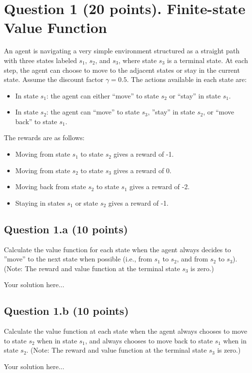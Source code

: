 \documentclass[12pt]{article}
\begin{document}
\section*{Question 1 (20 points). Finite-state Value Function}
An agent is navigating a very simple environment structured as a straight path with three states labeled $s_1$, $s_2$, and $s_3$, where state $s_3$ is a terminal state. At each step, the agent can choose to move to the adjacent states or stay in the current state. Assume the discount factor $\gamma = 0.5$.
The actions available in each state are: 
\begin{itemize}
    \item In state $s_1$: the agent can either “move” to state $s_2$ or “stay” in state $s_1$. 
    \item In state $s_2$: the agent can “move” to state $s_3$, ”stay” in state $s_2$, or “move back” to state $s_1$.
\end{itemize}
The rewards are as follows:\begin{itemize}
    \item Moving from state $s_1$ to state $s_2$ gives a reward of -1.
    \item Moving from state $s_2$ to state $s_3$ gives a reward of 0. 
    \item Moving back from state $s_2$ to state $s_1$ gives a reward of -2.
    \item Staying in states $s_1$ or state $s_2$ gives a reward of -1.
\end{itemize}
\subsection*{Question 1.a (10 points)}
Calculate the value function for each state when the agent always decides to ”move” to the next state when possible (i.e., from $s_1$ to $s_2$, and from $s_2$ to $s_3$). (Note: The reward and value function at the terminal state $s_3$ is zero.)
\begin{solution}
Your solution here...
\end{solution}

\subsection*{Question 1.b (10 points)}
Calculate the value function at each state when the agent always chooses to move to state $s_2$ when in state $s_1$, and always chooses to move back to state $s_1$ when in state $s_2$. (Note: The reward and value function at the terminal state $s_3$ is zero.)
\begin{solution}
Your solution here...
\end{solution}
\end{document}
